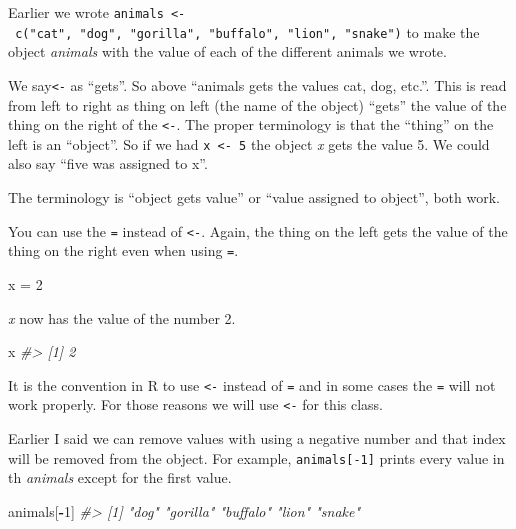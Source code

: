 \documentclass[
  12pt,
]{book}
\newenvironment{Shaded}{\begin{snugshade}}{\end{snugshade}}
\newcommand{\CommentTok}[1]{\textcolor[rgb]{0.37,0.37,0.37}{\textit{#1}}}
\newcommand{\DecValTok}[1]{\textcolor[rgb]{0.06,0.06,0.06}{#1}}
\newcommand{\NormalTok}[1]{#1}
\newcommand{\OperatorTok}[1]{\textcolor[rgb]{0.43,0.43,0.43}{\textbf{#1}}}
\newcommand{\StringTok}[1]{\textcolor[rgb]{0.5,0.5,0.5}{#1}}
\begin{document}
Earlier we wrote \texttt{animals\ \textless{}-\ c("cat",\ "dog",\ "gorilla",\ "buffalo",\ "lion",\ "snake")} to make the object \emph{animals} with the value of each of the different animals we wrote.

We say\texttt{\textless{}-} as ``gets''. So above ``animals gets the values cat, dog, etc.''. This is read from left to right as thing on left (the name of the object) ``gets'' the value of the thing on the right of the \texttt{\textless{}-}. The proper terminology is that the ``thing'' on the left is an ``object''. So if we had \texttt{x\ \textless{}-\ 5} the object \emph{x} gets the value 5. We could also say ``five was assigned to x''.

The terminology is ``object gets value'' or ``value assigned to object'', both work.

You can use the \texttt{=} instead of \texttt{\textless{}-}. Again, the thing on the left gets the value of the thing on the right even when using \texttt{=}.

\begin{Shaded}
\begin{Highlighting}[]
\NormalTok{x =}\StringTok{ }\DecValTok{2}
\end{Highlighting}
\end{Shaded}

\emph{x} now has the value of the number 2.

\begin{Shaded}
\begin{Highlighting}[]
\NormalTok{x}
\CommentTok{\#> [1] 2}
\end{Highlighting}
\end{Shaded}

It is the convention in R to use \texttt{\textless{}-} instead of \texttt{=} and in some cases the \texttt{=} will not work properly. For those reasons we will use \texttt{\textless{}-} for this class.

Earlier I said we can remove values with using a negative number and that index will be removed from the object. For example, \texttt{animals{[}-1{]}} prints every value in th \emph{animals} except for the first value.

\begin{Shaded}
\begin{Highlighting}[]
\NormalTok{animals[}\OperatorTok{{-}}\DecValTok{1}\NormalTok{]}
\CommentTok{\#> [1] "dog"     "gorilla" "buffalo" "lion"    "snake"}
\end{Highlighting}
\end{Shaded}
\end{document}
